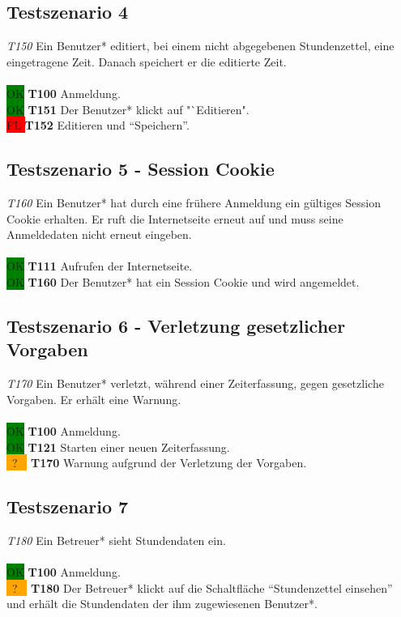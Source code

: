 \subsection{Testszenario 4}
\emph{T150} Ein Benutzer* editiert, bei einem nicht abgegebenen Stundenzettel, eine eingetragene Zeit. Danach speichert er die editierte Zeit.
\\\\
\colorbox{green}{OK} \textbf{T100} Anmeldung. \\
\colorbox{green}{OK} \textbf{T151} Der Benutzer* klickt auf "`Editieren". \\
\colorbox{red}{FL } \textbf{T152} Editieren und "`Speichern"'.

\subsection{Testszenario 5 - Session Cookie}
\emph{T160} Ein Benutzer* hat durch eine frühere Anmeldung ein gültiges Session Cookie erhalten. Er ruft die Internetseite erneut auf und muss seine Anmeldedaten nicht erneut eingeben.
\\\\
\colorbox{green}{OK} \textbf{T111} Aufrufen der Internetseite. \\
\colorbox{green}{OK} \textbf{T160} Der Benutzer* hat ein Session Cookie und wird angemeldet.

\subsection{Testszenario 6 - Verletzung gesetzlicher Vorgaben}
\emph{T170} Ein Benutzer* verletzt, während einer Zeiterfassung, gegen gesetzliche Vorgaben. Er erhält eine Warnung.
\\\\
\colorbox{green}{OK} \textbf{T100} Anmeldung. \\
\colorbox{green}{OK} \textbf{T121} Starten einer neuen Zeiterfassung. \\
\colorbox{orange}{  \ ? \  } \textbf{T170} Warnung aufgrund der Verletzung der Vorgaben.

\subsection{Testszenario 7}%
\emph{T180} Ein Betreuer* sieht Stundendaten ein.
\\\\
\colorbox{green}{OK} \textbf{T100} Anmeldung. \\
\colorbox{orange}{  \ ? \  } \textbf{T180} Der Betreuer* klickt auf die Schaltfläche "`Stundenzettel einsehen"' und erhält die Stundendaten der ihm zugewiesenen Benutzer*.

